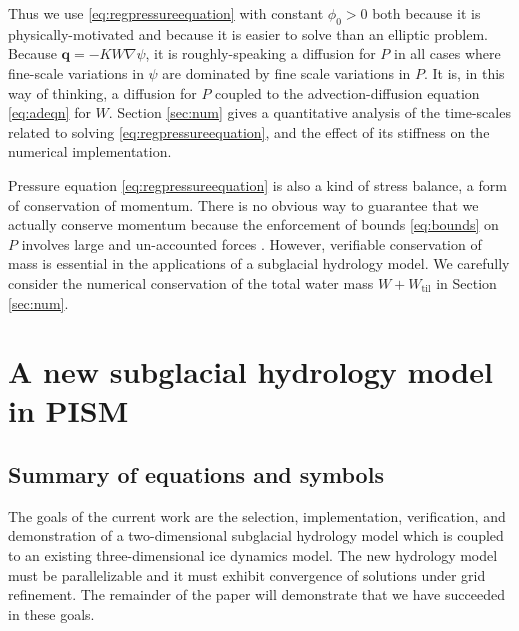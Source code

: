 \documentclass[gmd]{copernicus}   %
\newcommand{\text}{\textrm}
\newcommand\bq{\mathbf{q}}
\newcommand{\grad}{\nabla}
\newcommand{\Wtil}{W_{\text{til}}}
\begin{document}
Thus we use \eqref{eq:regpressureequation} with constant $\phi_0>0$ both because it is physically-motivated and because it is easier to solve than an elliptic problem.  Because $\bq = - K W \grad \psi$, it is roughly-speaking a diffusion for $P$ in all cases where fine-scale variations in $\psi$ are dominated by fine scale variations in $P$.  It is, in this way of thinking, a diffusion for $P$ coupled to the advection-diffusion equation \eqref{eq:adeqn} for $W$.  Section \ref{sec:num} gives a quantitative analysis of the time-scales related to solving \eqref{eq:regpressureequation}, and the effect of its stiffness on the numerical implementation.

Pressure equation \eqref{eq:regpressureequation} is also a kind of stress balance, a form of conservation of momentum.  There is no obvious way to guarantee that we actually conserve momentum because the enforcement of bounds \eqref{eq:bounds} on $P$ involves large and un-accounted forces \citep{Schoofetal2012}.  However, verifiable conservation of mass is essential in the applications of a subglacial hydrology model.  We carefully consider the numerical conservation of the total water mass $W+\Wtil$ in Section \ref{sec:num}.


\section{A new subglacial hydrology model in PISM} \label{sec:newmodel}

\subsection{Summary of equations and symbols}  The goals of the current work are the selection, implementation, verification, and demonstration of a two-dimensional subglacial hydrology model which is coupled to an existing three-dimensional ice dynamics model.  The new hydrology model must be parallelizable and it must exhibit convergence of solutions under grid refinement.  The remainder of the paper will demonstrate that we have succeeded in these goals.
\end{document}
